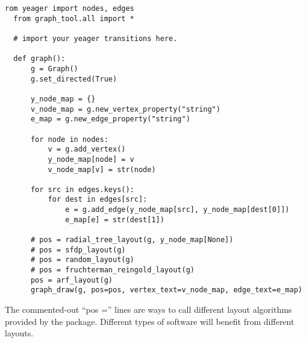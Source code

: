 \begin{Verbatim}[fontsize=\small]
  rom yeager import nodes, edges
  from graph_tool.all import *

  # import your yeager transitions here.

  def graph():
      g = Graph()
      g.set_directed(True)

      y_node_map = {}
      v_node_map = g.new_vertex_property("string")
      e_map = g.new_edge_property("string")

      for node in nodes:
          v = g.add_vertex()
          y_node_map[node] = v
          v_node_map[v] = str(node)

      for src in edges.keys():
          for dest in edges[src]:
              e = g.add_edge(y_node_map[src], y_node_map[dest[0]])
              e_map[e] = str(dest[1])

      # pos = radial_tree_layout(g, y_node_map[None])
      # pos = sfdp_layout(g)
      # pos = random_layout(g)
      # pos = fruchterman_reingold_layout(g)
      pos = arf_layout(g)
      graph_draw(g, pos=pos, vertex_text=v_node_map, edge_text=e_map)
\end{Verbatim}

The commented-out ``pos ='' lines are ways to call different layout algorithms provided by the package. Different types of software will benefit from different layouts.
